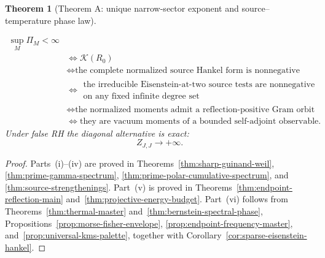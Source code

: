 \documentclass[11pt]{article}
\newtheorem{theorem}{Theorem}[section]
\begin{document}
\begin{theorem}[Theorem A: unique narrow-sector exponent and source--temperature phase law]
\begin{enumerate}[label=\textup{(\roman*)}]
\[\begin{aligned}
 \sup_M\Pi_M<\infty\\
 &\Longleftrightarrow \mathcal K(R_0)\\
 &\Longleftrightarrow
 \text{the complete normalized source Hankel form is nonnegative}\\
 &\Longleftrightarrow
 \substack{\text{the irreducible Eisenstein-at-two source tests are nonnegative}\\
 \text{on any fixed infinite degree set}}\\
 &\Longleftrightarrow
 \text{the normalized moments admit a reflection-positive Gram orbit}\\
 &\Longleftrightarrow
 \text{they are vacuum moments of a bounded self-adjoint observable}.
 \end{aligned}
 \tag{1.21}
\]
Under false RH the diagonal alternative is exact:
\[
 Z_{J,J}\longrightarrow+\infty.
 \tag{1.21a}
\]
\end{enumerate}
\end{theorem}

\begin{proof}
Parts~\textup{(i)}--\textup{(iv)} are proved in
Theorems~\ref{thm:sharp-guinand-weil}, \ref{thm:prime-gamma-spectrum},
\ref{thm:prime-polar-cumulative-spectrum}, and
\ref{thm:source-strengthenings}.  Part~\textup{(v)} is proved in
Theorems~\ref{thm:endpoint-reflection-main} and~\ref{thm:projective-energy-budget}.
Part~\textup{(vi)} follows from
Theorems~\ref{thm:thermal-master} and~\ref{thm:bernstein-spectral-phase},
Propositions~\ref{prop:morse-fisher-envelope},
\ref{prop:endpoint-frequency-master}, and~\ref{prop:universal-kms-palette}, together with
Corollary~\ref{cor:sparse-eisenstein-hankel}.
\end{proof}
\end{document}
